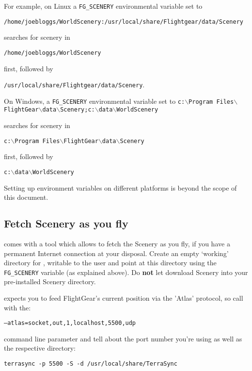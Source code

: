 For example, on Linux a \texttt{FG\_SCENERY} environmental variable set to

\noindent
\texttt{/home/joebloggs/WorldScenery:/usr/local/share/Flightgear/data/Scenery}

\noindent
searches for scenery in

\noindent
\texttt{/home/joebloggs/WorldScenery}

\noindent
first, followed by

\noindent
\texttt{/usr/local/share/Flightgear/data/Scenery}.

\medskip
On Windows, a \texttt{FG\_SCENERY} environmental variable set to
\texttt{c:$\backslash$Program Files$\backslash$FlightGear$\backslash$data$\backslash$Scenery;c:$\backslash$data$\backslash$WorldScenery}

\noindent
searches for scenery in

\noindent
\texttt{c:$\backslash$Program Files$\backslash$FlightGear$\backslash$data$\backslash$Scenery}


\noindent
first, followed by

\noindent
\texttt{c:$\backslash$data$\backslash$WorldScenery}

\medskip
Setting up environment variables on different platforms is beyond the scope of this document.

\subsection{Fetch Scenery as you fly}

\FlightGear{} comes with a tool \TerraSync{} which
allows to fetch the Scenery as you fly, if you have a permanent
Internet connection at your disposal. Create an empty `working'
directory for \TerraSync{}, writable to the user and point
\FlightGear{} at this directory using the \texttt{FG\_SCENERY} variable
(as explained above). Do \textbf{not} let \TerraSync{} download Scenery
into your pre-installed Scenery directory.

\TerraSync{} expects you to feed FlightGear's current position via the
'Atlas' protocol, so call \FlightGear{} with the:

\texttt{--atlas=socket,out,1,localhost,5500,udp}

command line parameter and tell \TerraSync{} about the port number you're
using as well as the respective directory:

\texttt{terrasync -p 5500 -S -d /usr/local/share/TerraSync}
\medskip

